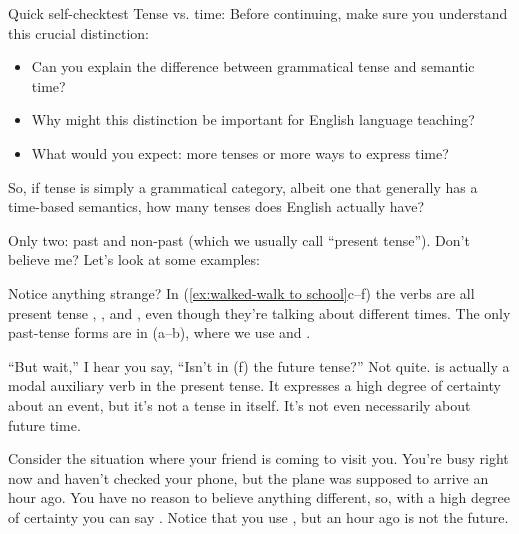 \begin{tblsframedsymbol}{Quick self-check}{test}
Tense vs. time: Before continuing, make sure you understand this crucial distinction:
\begin{itemize}[noitemsep, leftmargin=*]
    \item Can you explain the difference between grammatical tense and semantic time?
    \item Why might this distinction be important for English language teaching?
    \item What would you expect: more tenses or more ways to express time?
\end{itemize}
\end{tblsframedsymbol}

So, if tense is simply a grammatical category, albeit one that generally has a time-based semantics, how many tenses does English actually have?

Only two: past and non-past (which we usually call ``present tense''). Don't believe me? Let's look at some examples:

Notice anything strange? In (\ref{ex:walked-walk to school}c--f) the verbs are all present tense , , and , even though they're talking about different times. The only past-tense forms are in (a--b), where we use  and .

``But wait,'' I hear you say, \enquote{Isn't  in (f) the future tense?} Not quite.  is actually a modal auxiliary verb in the present tense. It expresses a high degree of certainty about an event, but it's not a tense in itself. It's not even necessarily about future time.

Consider the situation where your friend is coming to visit you. You're busy right now and haven't checked your phone, but the plane was supposed to arrive an hour ago. You have no reason to believe anything different, so, with a high degree of certainty you can say . Notice that you use , but an hour ago is not the future.

